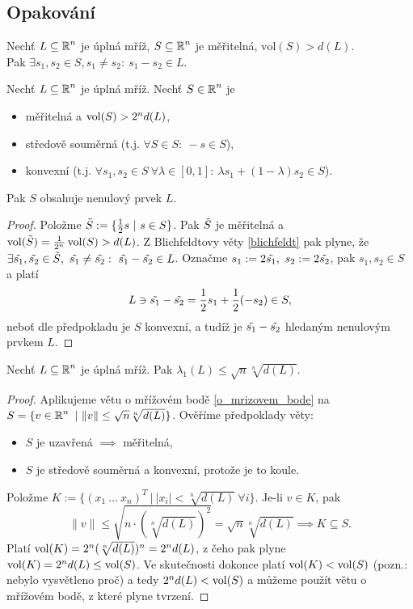 \subsection*{Opakování}
Nechť $L \subseteq \operatorname{\mathbb{R}}^n$ je úplná mříž, $S \subseteq \operatorname{\mathbb{R}}^n$ je měřitelná, $\text{vol}(S) > d(L)$.\\
Pak $\exists s_1, s_2 \in S, s_1 \neq s_2: \ s_1 - s_2 \in L$.
\newpage
\begin{theorem}\label{o_mrizovem_bode}
Nechť $L \subseteq \operatorname{\mathbb{R}}^n$ je úplná mříž. Nechť $S \in \operatorname{\mathbb{R}}^n$ je
\begin{itemize}
    \item měřitelná a $\operatorname{vol}(S) > 2^nd(L)$,
    \item středově souměrná (t.j. $\forall S \in S: \ -s \in S$),
    \item konvexní (t.j. $\forall s_1, s_2 \in S \ \forall \lambda \in [0,1]: \ \lambda s_1 + (1-\lambda)s_2 \in S$).
\end{itemize}
Pak $S$ obsahuje nenulový prvek $L$.
\end{theorem}
\begin{proof}
Položme $\Tilde{S} := \{\frac{1}{2}s \ | \ s \in S\}$. Pak $\Tilde{S}$ je měřitelná a $\operatorname{vol}(\Tilde{S}) = \frac{1}{2^n}\operatorname{vol}(S)>d(L)$. Z Blichfeldtovy věty \ref{blichfeldt} pak plyne, že $\exists \Tilde{s_1}, \Tilde{s_2} \in \Tilde{S}, \ \Tilde{s_1} \neq \Tilde{s_2}: \ \Tilde{s_1} - \Tilde{s_2} \in L$. Označme $s_1 := 2\Tilde{s_1}, \ s_2 := 2\Tilde{s_2}$, pak $s_1, s_2 \in S$ a platí $$L \ni \Tilde{s_1} - \Tilde{s_2} = \frac{1}{2}s_1 + \frac{1}{2}(-s_2) \in S,$$neboť dle předpokladu je $S$ konvexní, a tudíž je $\Tilde{s_1} - \Tilde{s_2}$ hledaným nenulovým prvkem $L$.
\end{proof}

\begin{theorem}[Minkowski]\label{minkowski_small}
Nechť $L \subseteq \operatorname{\mathbb{R}}^n$ je úplná mříž. Pak $\lambda_1(L) \leq \sqrt{n}\sqrt[n]{d(L)}$.
\end{theorem}
\begin{proof}
Aplikujeme větu o mřížovém bodě \ref{o_mrizovem_bode} na $S = \{ v \in \operatorname{\mathbb{R}}^n \ | \ \|v\| \leq \sqrt{n}\sqrt[n]{d(L)}\}$. Ověříme předpoklady věty:
\begin{itemize}
    \item $S$ je uzavřená $\implies$ měřitelná,
    \item $S$ je středově souměrná a konvexní, protože je to koule.
\end{itemize}
Položme $K := \{\left(x_1 \ \ldots \ x_n\right)^T \ | \ |x_i| < \sqrt[n]{d(L)} \ \forall i\}$. Je-li $v \in K$, pak $$\|v\| \leq \sqrt{n \cdot (\sqrt[n]{d(L)})^2} = \sqrt{n}\sqrt[n]{d(L)} \implies K \subseteq S.$$
Platí $\operatorname{vol}(K) = 2^n(\sqrt[n]{d(L)})^n = 2^nd(L)$, z čeho pak plyne $\operatorname{vol}(K) = 2^nd(L) \leq \operatorname{vol}(S)$. Ve skutečnosti dokonce platí $\operatorname{vol}(K) < \operatorname{vol}(S)$ (pozn.: nebylo vysvětleno proč) a tedy $2^nd(L) < \operatorname{vol}(S)$ a můžeme použít větu o mřížovém bodě, z které plyne tvrzení.
\end{proof}


